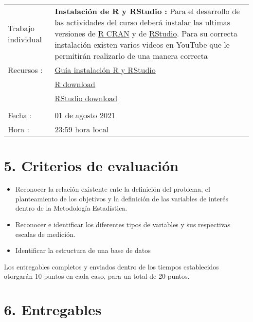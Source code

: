 \documentclass[base=hide,11pt]{elegantbook}
\begin{document}
\begin{tabular}{p{4cm}p{10cm}}
Trabajo individual & \textcolor{col3}{\bf Instalación de R y RStudio :} Para el  desarrollo  de las  actividades del curso deberá instalar las ultimas  versiones  de \href{https://www.r-project.org/}{R CRAN} y de \href{https://rstudio.com/products/rstudio/download/}{RStudio}. Para su correcta instalación  existen varios videos en  YouTube que le permitirán realizarlo de una manera correcta  \\ 
Recursos : & \href{URL}{Guía instalación R y RStudio}\\
           & \href{https://cran.r-project.org/}{R download}  \\
           & \href{https://rstudio.com/products/rstudio/download/}{RStudio download}\\
&\\
Fecha  : & 01 de agosto 2021\\
Hora   : & 23:59 hora local \\
\hline 
\end{tabular}
\section*{5. Criterios de evaluación}

\begin{itemize}
	\item Reconocer la relación existente ente la  definición del problema, el planteamiento de los objetivos y la  definición de las variables de interés dentro de la  Metodología Estadística.
	\item Reconocer e identificar los diferentes tipos de variables  y sus respectivas escalas de medición.
	\item Identificar la estructura de una base de datos
\end{itemize}

Los entregables completos y enviados dentro de los tiempos establecidos  otorgarán 10 puntos en cada caso, para un  total de 20 puntos. 

\section*{6. Entregables}
\end{document}
